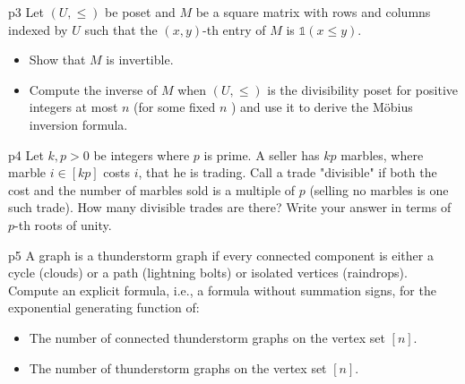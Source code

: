 \documentclass[a4paper, 11pt]{article}
\begin{document}
\begin{problem}{%
	}{p3%
	}
Let $(U, \leq)$ be poset and $M$ be a square matrix with rows and columns indexed by $U$ such that the $(x, y)$-th entry of $M$ is $\mathbb{1}(x \leq y)$.\begin{itemize}[label=$\bullet$]
	\item Show that $M$ is invertible.
	\item Compute the inverse of $M$ when $(U, \leq)$ is the divisibility poset for positive integers at most $n$ (for some fixed $n$ ) and use it to derive the Möbius inversion formula.
\end{itemize}
\end{problem}
\solve{	
}



\begin{problem}{%
	}{p4%
	}
Let $k, p>0$ be integers where $p$ is prime. A seller has $k p$ marbles, where marble $i \in[k p]$ costs \rupee$i$, that he is trading. Call a trade "divisible" if both the cost and the number of marbles sold is a multiple of $p$ (selling no marbles is one such trade). How many divisible trades are there? Write your answer in terms of $p$-th roots of unity.
\end{problem}
\solve{

}


\begin{problem}{%
}{p5%
}
A graph is a thunderstorm graph if every connected component is either a cycle (clouds) or a path (lightning bolts) or isolated vertices (raindrops). Compute an explicit formula, i.e., a formula without summation signs, for the exponential generating function of:
\begin{itemize}[label=$\bullet$]
	\item The number of connected thunderstorm graphs on the vertex set $[n]$.
	\item The number of thunderstorm graphs on the vertex set $[n]$.
\end{itemize}
\end{problem}
\solve{

}
\end{document}
